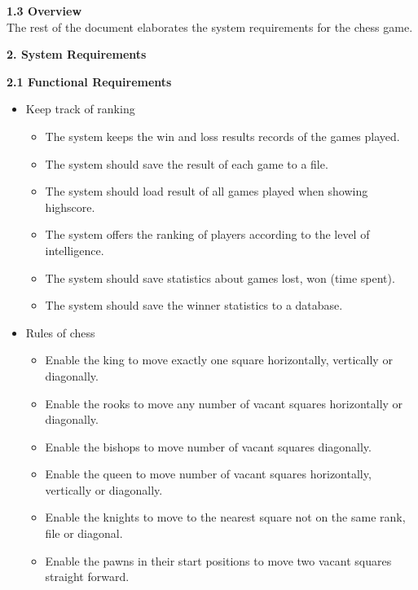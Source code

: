 \documentclass{article}
\begin{document}
\begin{flushleft}
\begin{itemize}
\end{itemize}

\vspace{5mm}
\textbf{1.3	Overview}\\
\vspace{1mm}
The rest of the document elaborates the system requirements for the chess game.\\
\vspace{10mm}

\newpage

\begin{Large}\textbf{2.	System Requirements}\\
\end{Large}
\vspace{3mm}
\textbf{2.1	Functional Requirements}\\
\begin{itemize}
	\item Keep track of ranking
	\begin{itemize}
		\item The system keeps the win and loss results records of the games played.
		\item The system should save the result of each game to a file.
		\item The system should load result of all games played when showing highscore.
		\item The system offers the ranking of players according to the level of intelligence.
		\item The system should save statistics about games lost, won (time spent).
		\item The system should save the winner statistics to a database.
	\end{itemize}
	\item Rules of chess
	\begin{itemize}
		\item Enable the king to move exactly one square horizontally, vertically or diagonally.
		\item Enable the rooks to move any number of vacant squares horizontally or diagonally. 
		\item Enable the bishops to move number of vacant squares diagonally.
		\item Enable the queen to move number of vacant squares horizontally, vertically or diagonally.
		\item Enable the knights to move to the nearest square not on the same rank, file or diagonal. 
		\item Enable the pawns in their start positions to move two  vacant squares straight forward.

\end{itemize}
\end{itemize}
\end{flushleft}
\end{document}

